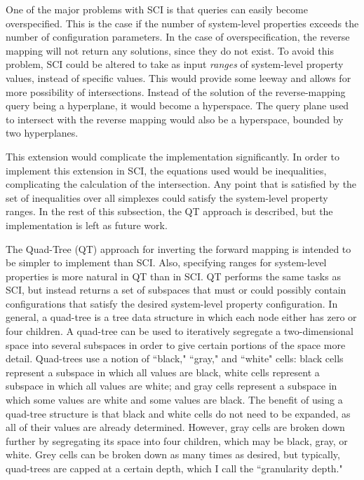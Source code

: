 One of the major problems with SCI is that queries can easily become overspecified.
This is the case if the number of system-level properties exceeds the number of configuration parameters.
In the case of overspecification, the reverse mapping will not return any solutions, since they do not exist.
To avoid this problem, SCI could be altered to take as input \textit{ranges} of system-level property values, instead of specific values.
This would provide some leeway and allows for more possibility of intersections.
Instead of the solution of the reverse-mapping query being a hyperplane, it would become a hyperspace.
The query plane used to intersect with the reverse mapping would also be a hyperspace, bounded by two hyperplanes.

This extension would complicate the implementation significantly.
In order to implement this extension in SCI, the equations used would be inequalities, complicating the calculation of the intersection.
Any point that is satisfied by the set of inequalities over all simplexes could satisfy the system-level property ranges.
In the rest of this subsection, the QT approach is described, but the implementation is left as future work.

The Quad-Tree (QT) approach for inverting the forward mapping is intended to be simpler to implement than SCI.
Also, specifying ranges for system-level properties is more natural in QT than in SCI.
QT performs the same tasks as SCI, but instead returns a set of subspaces that must or could possibly contain configurations that satisfy the desired system-level property configuration.
In general, a quad-tree is a tree data structure in which each node either has zero or four children.
A quad-tree can be used to iteratively segregate a two-dimensional space into several subspaces in order to give certain portions of the space more detail.
Quad-trees use a notion of ``black," ``gray," and ``white" cells: black cells represent a subspace in which all values are black, white cells represent a subspace in which all values are white; and gray cells represent a subspace in which some values are white and some values are black.
The benefit of using a quad-tree structure is that black and white cells do not need to be expanded, as all of their values are already determined.
However, gray cells are broken down further by segregating its space into four children, which may be black, gray, or white.
Grey cells can be broken down as many times as desired, but typically, quad-trees are capped at a certain depth, which I call the ``granularity depth."

